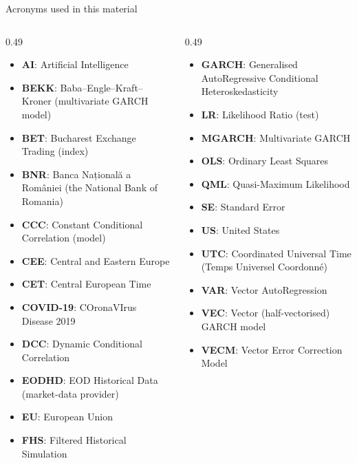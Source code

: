 \begin{frame}{Acronyms used in this material}
\begin{columns}[T]
\begin{column}{0.49\textwidth}
\begin{itemize}\setlength{\itemsep}{0pt}
    \item \textbf{AI}: Artificial Intelligence
    \item \textbf{BEKK}: Baba–Engle–Kraft–Kroner (multivariate GARCH model)
    \item \textbf{BET}: Bucharest Exchange Trading (index)
    \item \textbf{BNR}: Banca Națională a României (the National Bank of Romania)
    \item \textbf{CCC}: Constant Conditional Correlation (model)
    \item \textbf{CEE}: Central and Eastern Europe
    \item \textbf{CET}: Central European Time
    \item \textbf{COVID-19}: COronaVIrus Disease 2019
    \item \textbf{DCC}: Dynamic Conditional Correlation
    \item \textbf{EODHD}: EOD Historical Data (market-data provider)
    \item \textbf{EU}: European Union
    \item \textbf{FHS}: Filtered Historical Simulation
\end{itemize}
\end{column}
\begin{column}{0.49\textwidth}
\begin{itemize}\setlength{\itemsep}{0pt}
    \item \textbf{GARCH}: Generalised AutoRegressive Conditional Heteroskedasticity
    \item \textbf{LR}: Likelihood Ratio (test)
    \item \textbf{MGARCH}: Multivariate GARCH
    \item \textbf{OLS}: Ordinary Least Squares
    \item \textbf{QML}: Quasi-Maximum Likelihood
    \item \textbf{SE}: Standard Error
    \item \textbf{US}: United States
    \item \textbf{UTC}: Coordinated Universal Time (Temps Universel Coordonné)
    \item \textbf{VAR}: Vector AutoRegression
    \item \textbf{VEC}: Vector (half-vectorised) GARCH model
    \item \textbf{VECM}: Vector Error Correction Model
\end{itemize}
\end{column}
\end{columns}
\end{frame}


